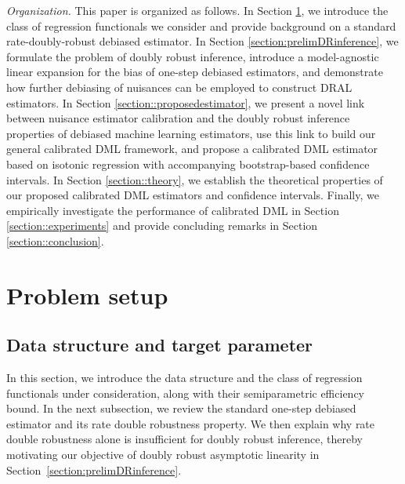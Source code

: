\documentclass[11pt]{article}
\theoremstyle{plain}
\begin{document}
  

 
 
 

 
\medskip\noindent \emph{Organization.} This paper is organized as follows. In Section \ref{section::startsetup}, we introduce the class of regression functionals we consider and provide background on a standard rate-doubly-robust debiased estimator. In Section \ref{section:prelimDRinference}, we formulate the problem of doubly robust inference, introduce a model-agnostic linear expansion for the bias of one-step debiased estimators, and demonstrate how further debiasing of nuisances can be employed to construct DRAL estimators. In Section \ref{section::proposedestimator}, we present a novel link between nuisance estimator calibration and the doubly robust inference properties of debiased machine learning estimators, use this link to build our general calibrated DML framework, and propose a calibrated DML estimator based on isotonic regression with accompanying bootstrap-based confidence intervals. In Section \ref{section::theory}, we establish the theoretical properties of our proposed calibrated DML estimators and confidence intervals. Finally, we empirically investigate the performance of calibrated DML in Section \ref{section::experiments} and provide concluding remarks in Section \ref{section::conclusion}.



 

 \section{Problem setup}
 
 \label{section::startsetup}
 
\subsection{Data structure and target parameter}
\label{section::setup}
 
In this section, we introduce the data structure and the class of regression
functionals under consideration, along with their semiparametric efficiency
bound. In the next subsection, we review the standard one-step debiased
estimator and its rate double robustness property. We then explain why rate
double robustness alone is insufficient for doubly robust inference, thereby
motivating our objective of doubly robust asymptotic linearity in
Section~\ref{section:prelimDRinference}.
\end{document}
